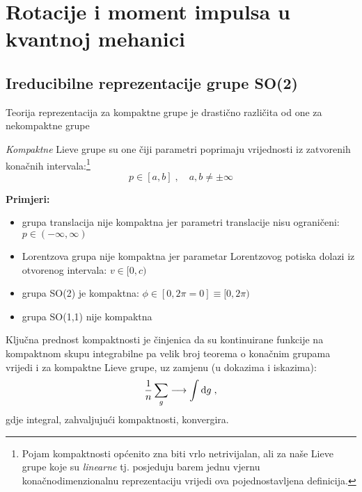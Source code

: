 
\chapter{Rotacije i moment impulsa u kvantnoj mehanici}
\label{ch:rotacije}

\section{Ireducibilne reprezentacije grupe SO(2)}

Teorija reprezentacija za kompaktne grupe je drastično različita
 od one za nekompaktne grupe

 \emph{Kompaktne} Lieve grupe su one čiji parametri poprimaju
   vrijednosti iz zatvorenih konačnih intervala:\footnote{
  Pojam kompaktnosti općenito zna biti vrlo netrivijalan, ali za
   naše Lieve grupe koje su \emph{linearne} tj. posjeduju barem
   jednu vjernu konačnodimenzionalnu reprezentaciju vrijedi ova
 pojednostavljena definicija.}
\begin{displaymath}
         p \in [a, b]\;,  \quad a,b\neq \pm \infty
\end{displaymath}

\textbf{Primjeri:}
\begin{itemize}
\item grupa translacija nije kompaktna jer parametri translacije
      nisu ograničeni: $p \in (-\infty, \infty)$
\item Lorentzova grupa nije kompaktna jer parametar Lorentzovog
      potiska dolazi iz otvorenog intervala: $v \in [0,c)$
\item grupa SO(2) je kompaktna: $\phi\in[0, 2\pi=0]\equiv[0,2\pi)$
\item grupa SO(1,1) nije kompaktna
\end{itemize}

Ključna prednost kompaktnosti je činjenica da su kontinuirane funkcije
na kompaktnom skupu integrabilne pa 
velik broj teorema o konačnim grupama vrijedi i za kompaktne Lieve
grupe, uz zamjenu (u dokazima i iskazima):
\begin{displaymath}
    \frac{1}{n} \sum_{g} \longrightarrow \int \textrm{d} g \;,
\end{displaymath}
gdje integral, zahvaljujući kompaktnosti, konvergira.

